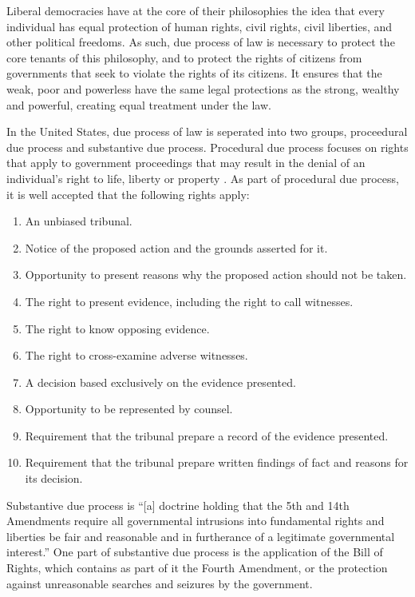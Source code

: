 \documentclass[12pt]{article} %
\begin{document}
Liberal democracies have at the core of their philosophies the idea that every individual has equal protection of human rights, civil rights, civil liberties, and other political freedoms. As such, due process of law is necessary to protect the core tenants of this philosophy, and to protect the rights of citizens from governments that seek to violate the rights of its citizens. It ensures that the weak, poor and powerless have the same legal protections as the strong, wealthy and powerful, creating equal treatment under the law.

In the United States, due process of law is seperated into two groups, proceedural due process and substantive due process. Procedural due process focuses on rights that apply to government proceedings that may result in the denial of an individual's right to life, liberty or property \cite{wex_procedural}. As part of procedural due process, it is well accepted that the following rights apply: \cite{friendly}

\begin{enumerate}
\item An unbiased tribunal.
\item Notice of the proposed action and the grounds asserted for it.
\item Opportunity to present reasons why the proposed action should not be taken.
\item The right to present evidence, including the right to call witnesses.
\item The right to know opposing evidence.
\item The right to cross-examine adverse witnesses.
\item A decision based exclusively on the evidence presented.
\item Opportunity to be represented by counsel.
\item Requirement that the tribunal prepare a record of the evidence presented.
\item Requirement that the tribunal prepare written findings of fact and reasons for its decision.
\end{enumerate}

Substantive due process is ``[a] doctrine holding that the 5th and 14th Amendments require all governmental intrusions into fundamental rights and liberties be fair and reasonable and in furtherance of a legitimate governmental interest.'' \cite{wex_substantive} One part of substantive due process is the application of the Bill of Rights, which contains as part of it the Fourth Amendment, or the protection against unreasonable searches and seizures by the government.
\end{document}
